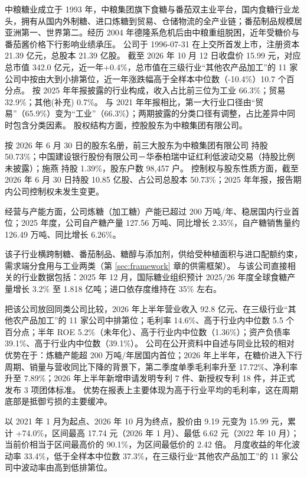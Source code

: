  中粮糖业成立于 1993 年，中粮集团旗下食糖与番茄双主业平台，国内食糖行业龙头，拥有从国内外制糖、进口炼糖到贸易、仓储物流的全产业链；番茄制品规模居亚洲第一、世界第二。经历 2004 年德隆系危机后由中粮重组脱困，近年受糖价与番茄酱价格下行影响业绩承压。 公司于 1996-07-31 在上交所首发上市，注册资本 21.39 亿元，总股本 21.39 亿股。 截至 2026 年 10 月 12 日收盘价 15.99 元，对应总市值 342.0 亿元，近一年+0.4\%，总市值在三级行业“其他农产品加工”的 11 家公司中按由大到小排第位，近一年涨跌幅高于全样本中位数（-10.4\%）10.7 个百分点。 按 2025 年年报披露的行业构成，收入占比前三位为工业 66.3\%；贸易 32.9\%；其他(补充) 0.7\%。 与 2021 年年报相比，第一大行业口径由“贸易”（65.9\%）变为“工业”（66.3\%）；两期披露的分类口径有调整，占比差异中同时包含分类因素。 股权结构方面，控股股东为中粮集团有限公司。

 按 2026 年 6 月 30 日的股东名册，前三大股东为中粮集团有限公司 持股 50.73\%；中国建设银行股份有限公司－华泰柏瑞中证红利低波动交易（持股比例未披露）；施燕 持股 1.39\%，股东户数 98,457 户。 控制权与股东性质方面，截至 2026 年 6 月 30 日持股 10.85 亿股、占公司总股本 50.73\%；2025 年年报，报告期内公司控制权未发生变更。

 经营与产能方面，公司炼糖（加工糖）产能已超过 200 万吨/年、稳居国内行业首位；2025 年度，公司自产糖产量 127.56 万吨、同比增长 2.35\%，自产糖销售量约 126.49 万吨、同比增长 6.26\%。

 该子行业横跨制糖、番茄制品、糖醇与添加剂，供给受种植面积与进口配额约束，需求端分食用与工业两类（第 \ref{sec:framework} 章的供需框架）。 与该公司直接相关的行业数据包括：2025 年 12 月，国际糖业组织预计 2025/26 年度全球食糖产量增长 3.2\% 至 1.818 亿吨；进口依存度维持在 35\% 左右。

 把该公司放回同类公司比较，2026 年上半年营业收入 92.8 亿元、在三级行业“其他农产品加工”的 11 家公司中排第位；毛利率 14.6\%、高于行业内中位数 5.5 个百分点；半年 ROE 5.2\%（未年化）、高于行业内中位数（1.36\%）；资产负债率 39.1\%、高于行业内中位数（39.1\%）。 公司在公开资料中自述与同业比较的相对优势在于：炼糖产能超 200 万吨/年居国内首位；2026 年上半年，在糖价进入下行周期、销量与营收同比下降的背景下，第二季度单季毛利率升至 17.72\%、净利率升至 7.89\%；2026 年上半年新增申请发明专利 7 件、新授权专利 18 件，并正式发布 3 项团体标准。 优势在报表上主要体现为高于行业平均的毛利率，这在周期底部是抵御亏损的主要缓冲。

 以 2021 年 1 月为起点、2026 年 10 月为终点，股价由 9.19 元变为 15.99 元，累计 +74.0\%，区间最高 17.74 元（2026 年 1 月）、最低 6.62 元（2022 年 10 月）；当前价相当于区间最高价的 90.1\%，为区间最低价的 2.42 倍。 月度收益的年化波动率 33.4\%，低于全样本中位数 37.3\%，在三级行业“其他农产品加工”的 11 家公司中波动率由高到低排第位。

